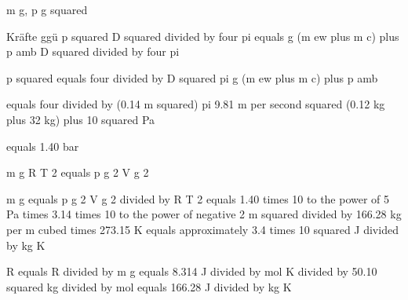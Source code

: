 m g, p g squared

Kräfte ggü p squared D squared divided by four pi equals g (m ew plus m c) plus p amb D squared divided by four pi

p squared equals four divided by D squared pi g (m ew plus m c) plus p amb

equals four divided by (0.14 m squared) pi 9.81 m per second squared (0.12 kg plus 32 kg) plus 10 squared Pa

equals 1.40 bar

m g R T 2 equals p g 2 V g 2

m g equals p g 2 V g 2 divided by R T 2 equals 1.40 times 10 to the power of 5 Pa times 3.14 times 10 to the power of negative 2 m squared divided by 166.28 kg per m cubed times 273.15 K equals approximately 3.4 times 10 squared J divided by kg K

R equals R divided by m g equals 8.314 J divided by mol K divided by 50.10 squared kg divided by mol equals 166.28 J divided by kg K